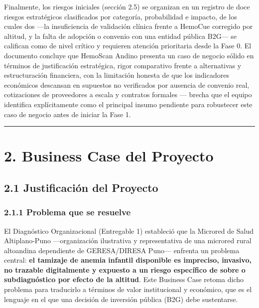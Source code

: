 \documentclass[11pt,a4paper]{article}
\begin{document}
Finalmente, los riesgos iniciales (sección 2.5) se organizan en un registro de doce riesgos estratégicos clasificados por categoría, probabilidad e impacto, de los cuales dos ---la insuficiencia de validación clínica frente a HemoCue corregido por altitud, y la falta de adopción o convenio con una entidad pública B2G--- se califican como de nivel crítico y requieren atención prioritaria desde la Fase 0. El documento concluye que HemoScan Andino presenta un caso de negocio sólido en términos de justificación estratégica, rigor comparativo frente a alternativas y estructuración financiera, con la limitación honesta de que los indicadores económicos descansan en supuestos no verificados por ausencia de convenio real, cotizaciones de proveedores a escala y contratos formales --- brecha que el equipo identifica explícitamente como el principal insumo pendiente para robustecer este caso de negocio antes de iniciar la Fase 1.

\begin{center}\rule{0.5\linewidth}{0.5pt}\end{center}

\section{2. Business Case del Proyecto}\label{business-case-del-proyecto}

\subsection{2.1 Justificación del Proyecto}\label{justificaciuxf3n-del-proyecto}

\subsubsection{2.1.1 Problema que se resuelve}\label{problema-que-se-resuelve}

El Diagnóstico Organizacional (Entregable 1) estableció que la Microred de Salud Altiplano-Puno ---organización ilustrativa y representativa de una microred rural altoandina dependiente de GERESA/DIRESA Puno--- enfrenta un problema central: \textbf{el tamizaje de anemia infantil disponible es impreciso, invasivo, no trazable digitalmente y expuesto a un riesgo específico de sobre o subdiagnóstico por efecto de la altitud}. Este Business Case retoma dicho problema para traducirlo a términos de valor institucional y económico, que es el lenguaje en el que una decisión de inversión pública (B2G) debe sustentarse.
\end{document}
